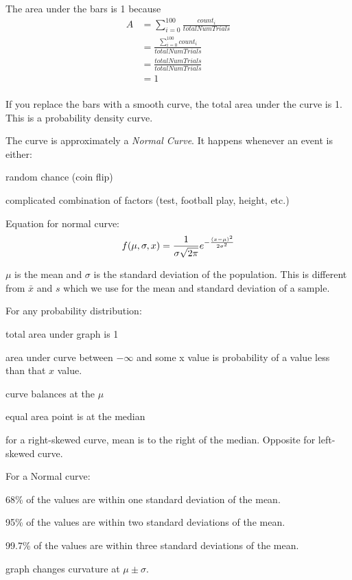 \documentclass[landscape]{exam}
\begin{document}
  The area under the bars is 1 because
  \begin{align*}
    A & = \sum_{i = 0}^{100} \frac{count_i}{totalNumTrials} \\
      & = \frac{\sum_{i = 0}^{100} count_i}{totalNumTrials} \\
      & = \frac{totalNumTrials}{totalNumTrials} \\
      & = 1 \\
  \end{align*}

  If you replace the bars with a smooth curve, the total area under the curve is
  1. This is a probability density curve.

  The curve is approximately a {\em Normal Curve}.  It happens whenever an event
  is either:
  \begin{itemize*}
    \item random chance (coin flip)
    \item complicated combination of factors (test, football play, height, etc.)
  \end{itemize*}

  Equation for normal curve:
  \[
    f(\mu, \sigma, x) = \frac{1}{\sigma\sqrt{2\pi}} e^{ -\frac{\del{ x-\mu }^2}{2\sigma^2} }
  \]

  $\mu$ is the mean and $\sigma$ is the standard deviation of the
  population. This is different from $\bar{x}$ and $s$ which we use for the mean
  and standard deviation of a sample.

  For any probability distribution:
  \begin{itemize*}
    \item total area under graph is 1

    \item area under curve between $-\infty$ and some x value is probability of
      a value less than that $x$ value.

    \item curve balances at the $\mu$

    \item equal area point is at the median

    \item for a right-skewed curve, mean is to the right of the median. Opposite
      for left-skewed curve.
  \end{itemize*}

  For a Normal curve:
  \begin{itemize*}
    \item 68\% of the values are within one standard deviation of the mean.

    \item 95\% of the values are within two standard deviations of the mean.

    \item 99.7\% of the values are within three standard deviations of the mean.

    \item graph changes curvature at $\mu \pm \sigma$.

  \end{itemize*}
\end{document}
